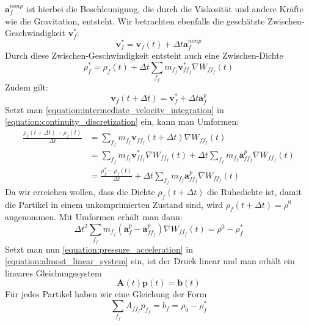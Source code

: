 \documentclass{scrreprt}
\begin{document}
$\textbf{a}_f^{nonp}$ ist hierbei die Beschleunigung, die durch die Viskosität und andere Kräfte wie die Gravitation, entsteht.
Wir betrachten ebenfalls die geschätzte Zwischen-Geschwindigkeit $\textbf{v}_f^*$:
\begin{equation}
    \textbf{v}_f^* = \textbf{v}_f(t) + \Delta t \textbf{a}_f^{nonp}
\end{equation}
Durch diese Zwischen-Geschwindigkeit entsteht auch eine Zwischen-Dichte
\begin{equation}
    \rho_f^* = \rho_f(t) + \Delta t \sum_{f_f} m_{f_f} \textbf{v}_{ff_f}^* \nabla W_{ff_f}(t)
\end{equation}
Zudem gilt:
\begin{equation}
    \label{equation:intermediate_velocity_integration}
    \textbf{v}_f(t + \Delta t) = \textbf{v}_f^* + \Delta t \textbf{a}_f^p
\end{equation}
Setzt man \eqref{equation:intermediate_velocity_integration} in \eqref{equation:continuity_discretization} ein, kann man Umformen:
\begin{align}
    \frac{\rho_f(t+\Delta t) - \rho_f(t)}{\Delta t} &= \sum_{f_f} m_{f_f} \textbf{v}_{ff_f}(t+\Delta t) \nabla W_{ff_f}(t) \\
        &= \sum_{f_f} m_{f_f} \textbf{v}_{ff_f}^* \nabla W_{ff_f}(t) + \Delta t \sum_{f_f} m_{f_f} \textbf{a}_{ff_f}^p \nabla W_{ff_f}(t) \\
        &= \frac{\rho_f^* - \rho_f(t)}{\Delta t} + \Delta t \sum_{f_f} m_{f_f} \textbf{a}_{ff_f}^p \nabla W_{ff_f}(t)
\end{align}
Da wir erreichen wollen, dass die Dichte $\rho_f(t+\Delta t)$ die Ruhedichte ist, damit die Partikel in einem unkomprimierten Zustand sind,
wird $\rho_f(t+\Delta t) = \rho^0$ angenommen.
Mit Umformen erhält man dann:
\begin{equation}
    \label{equation:almost_linear_system}
    \Delta t^2 \sum_{f_f} m_{f_f} \left(\textbf{a}_f^p - \textbf{a}_{ff_f}^p\right) \nabla W_{ff_f}(t) = \rho^0 - \rho_f^*
\end{equation}
Setzt man nun \eqref{equation:pressure_acceleration} in \eqref{equation:almost_linear_system} ein, ist der Druck linear und man erhält ein lineares Gleichungssystem
\begin{equation}
    \textbf{A}(t) \textbf{p}(t) = \textbf{b}(t)
\end{equation}
Für jedes Partikel haben wir eine Gleichung der Form
\begin{equation}
    \sum_{f_f} A_{ff_f} p_{f_f} = b_f = \rho_0 - \rho_f^*
\end{equation}
\end{document}

